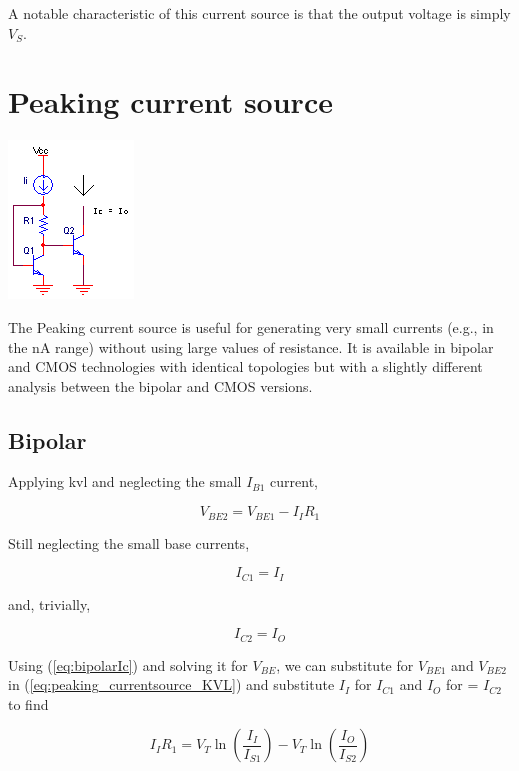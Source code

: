 A notable characteristic of this current source is that the output voltage is simply $V_{S}$.

\section{Peaking current source}
\begin{center}
	\includegraphics{schematics/peakingcurrentsource.PNG}
\end{center}
The Peaking current source is useful for generating very small currents (e.g., in the nA range) without using large values of resistance.
It is available in bipolar and CMOS technologies with identical topologies but with a slightly different analysis between the bipolar and CMOS versions.

\subsection{Bipolar}
Applying \ac{kvl} and neglecting the small $I_{B1}$ current,

\begin{equation}
V_{BE2} = V_{BE1} - I_{I}R_{1}
\label{eq:peaking_currentsource_KVL}
\end{equation}

Still neglecting the small base currents,

\begin{equation}
I_{C1} = I_{I}
\end{equation}

and, trivially,

\begin{equation}
I_{C2} = I_{O}
\end{equation}

Using (\ref{eq:bipolarIc}) and solving it for $V_{BE}$, we can substitute for $V_{BE1}$ and $V_{BE2}$ in (\ref{eq:peaking_currentsource_KVL}) and substitute $I_{I}$ for $I_{C1}$ and $I_{O}$ for = $I_{C2}$ to find

\begin{equation}
I_{I}R_{1} = V_{T}\ln\left(\frac{I_{I}}{I_{S1}}\right) - V_{T}\ln\left(\frac{I_{O}}{I_{S2}}\right)
\label{eq:peaking_currentsource_transferfunc_first}
\end{equation}

